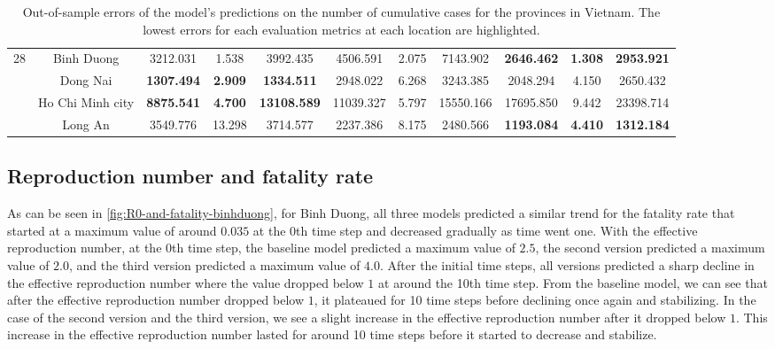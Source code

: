 \begin{landscape}
\begin{table}[!htb]
\begin{tabular}{| c | c | c | c | c | c | c | c | c | c | c |}
        \multirow{4}{*}{28}
            & Binh Duong & 3212.031 & 1.538 & 3992.435 & 4506.591 & 2.075 & 7143.902 & \textbf{2646.462} & \textbf{1.308} & \textbf{2953.921} \\
            & Dong Nai & \textbf{1307.494} & \textbf{2.909} & \textbf{1334.511} & 2948.022 & 6.268 & 3243.385 & 2048.294 & 4.150 & 2650.432 \\
            & Ho Chi Minh city & \textbf{8875.541} & \textbf{4.700} & \textbf{13108.589} & 11039.327 & 5.797 & 15550.166 & 17695.850 & 9.442 & 23398.714 \\
            & Long An & 3549.776 & 13.298 & 3714.577 & 2237.386 & 8.175 & 2480.566 & \textbf{1193.084} & \textbf{4.410} & \textbf{1312.184} \\ \hline
    \end{tabular}
    \caption{Out-of-sample errors of the model's predictions on the number of cumulative cases for the provinces in Vietnam. The lowest errors for each evaluation metrics at each location are highlighted.}
    \label{tab:errors-vn-provinces-total-cases}
\end{table}
\end{landscape}

\subsection{Reproduction number and fatality rate}

As can be seen in \autoref{fig:R0-and-fatality-binhduong}, for Binh Duong, all three models predicted a similar trend for the fatality rate that started at a maximum value of around $0.035$ at the 0th time step and decreased gradually as time went one.
With the effective reproduction number, at the 0th time step, the baseline model predicted a maximum value of $2.5$, the second version predicted a maximum value of $2.0$, and the third version predicted a maximum value of $4.0$.
After the initial time steps, all versions predicted a sharp decline in the effective reproduction number where the value dropped below $1$ at around the 10th time step.
From the baseline model, we can see that after the effective reproduction number dropped below $1$, it plateaued for 10 time steps before declining once again and stabilizing.
In the case of the second version and the third version, we see a slight increase in the effective reproduction number after it dropped below $1$.
This increase in the effective reproduction number lasted for around 10 time steps before it started to decrease and stabilize.

